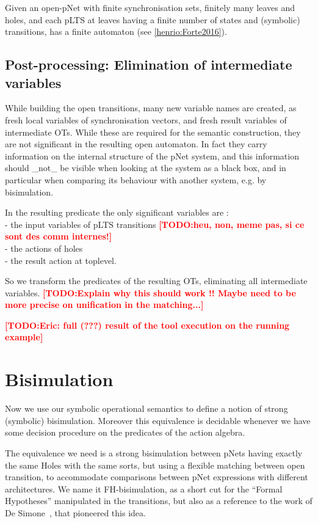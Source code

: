 \documentclass{lncs/llncs}
\newcommand{\TODO}[1]{\textcolor{red}{\textbf{[TODO:#1]}}}
\begin{document}
Given an open-pNet
with finite synchronisation sets, finitely many leaves and
holes, and each pLTS at leaves having a finite number of states and
(symbolic) transitions, has a finite automaton (see \ref{henrio:Forte2016}).

\subsection{Post-processing: Elimination of intermediate variables}

While building the open transitions, many new variable names are
created, as fresh local variables of synchronisation vectors, and
fresh result variables of intermediate OTs. While these are required
for the semantic construction, they are not significant in the
resulting open automaton. In fact they carry information on the
internal structure of the pNet system, and this information should
\_not\_ be visible when looking at the system as a black box, and in
particular when comparing its behaviour with another system, e.g. by
bisimulation. 

In the resulting predicate the only significant variables are :\\
- the input variables of pLTS transitions \TODO{heu, non, meme pas, si
  ce sont des comm internes!}\\
- the actions of holes\\
- the result action at toplevel.

So we transform the predicates of the resulting OTs, eliminating all
intermediate variables. \TODO{Explain why this should work !! Maybe
  need to be more precise on unification in the matching...} 


\TODO{Eric: full (???) result of the tool execution on the running example}


\section{Bisimulation}
\label{section:bisimulation}

	Now we use our symbolic operational semantics to define a notion of
	strong (symbolic) bisimulation. Moreover this equivalence is decidable whenever we 
	have some
	decision procedure on the predicates of the action algebra.



The equivalence we need is a strong bisimulation between
pNets having exactly the same Holes with the same sorts, but using a
flexible matching 
between open transition, to accommodate comparisons between pNet
expressions with different architectures.
 We name it FH-bisimulation,
 as a short cut for the ``Formal Hypotheses'' manipulated in the
 transitions, but also as a reference to the work of De Simone~\cite{deSimone85},
 that pioneered this idea.
\end{document}
